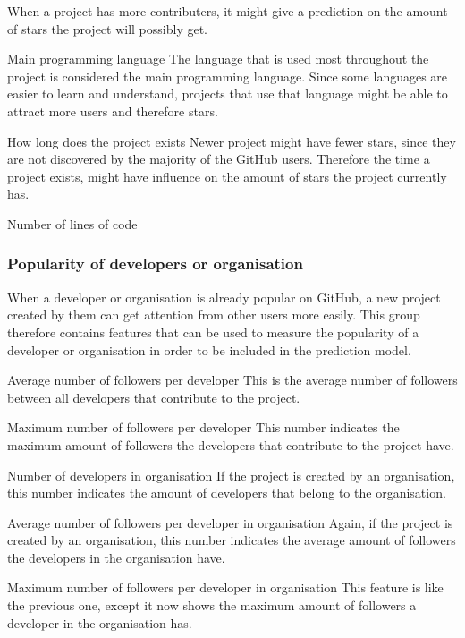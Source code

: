 \begin{LaTeXdescription}
        When a project has more contributers, it might give a prediction on the amount of stars the project will possibly get.
        \item[Main programming language]
        The language that is used most throughout the project is considered the main programming language. 
        Since some languages are easier to learn and understand, projects that use that language might be able to attract more users and therefore stars.
        \item[How long does the project exists]
        Newer project might have fewer stars, since they are not discovered by the majority of the GitHub users. 
        Therefore the time a project exists, might have influence on the amount of stars the project currently has.
        \item[Number of lines of code] 
    \end{LaTeXdescription}


    \subsubsection{Popularity of developers or organisation}
    When a developer or organisation is already popular on GitHub, a new project created by them can get attention from other users more easily.
    This group therefore contains features that can be used to measure the popularity of a developer or organisation in order to be included in the prediction model.
    \begin{LaTeXdescription}
        \item[Average number of followers per developer]
        This is the average number of followers between all developers that contribute to the project.
        \item[Maximum number of followers per developer]
        This number indicates the maximum amount of followers the developers that contribute to the project have.
        \item[Number of developers in organisation]
        If the project is created by an organisation, this number indicates the amount of developers that belong to the organisation.
        \item[Average number of followers per developer in organisation]
        Again, if the project is created by an organisation, this number indicates the average amount of followers the developers in the organisation have.
        \item[Maximum number of followers per developer in organisation]
        This feature is like the previous one, except it now shows the maximum amount of followers a developer in the organisation has.
    \end{LaTeXdescription}

